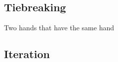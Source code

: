 \subsection{Tiebreaking}
\label{sec:Tiebreaking}
Two hands that have the same hand

\subsection{Iteration}
\label{sec:Iteration}


\clearpage
